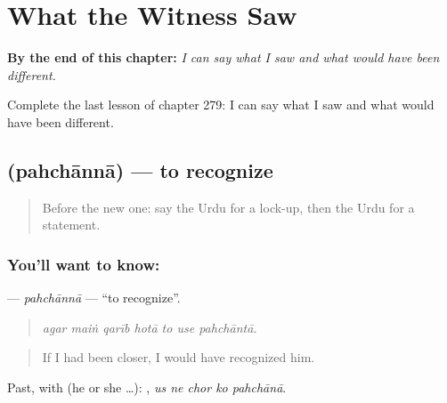 
\chapter{What the Witness Saw}
\label{ch:ur-what-the-witness-saw}

\begin{chapteropening}
\textbf{By the end of this chapter:} \emph{I can say what I saw and what would have been different.}

Complete the last lesson of chapter 279: I can say what I saw and what would have been different.
\end{chapteropening}

\section[\texorpdfstring{\ur{پہچاننا} (pahchānnā)}{پہچاننا (pahchānnā)}]{ (pahchānnā) — to recognize}

\label{lesson:UR-C279-pahchanna}



\begin{quote}
Before the new one: say the Urdu for a lock-up, then the Urdu for a statement.
\end{quote}

\subsection*{You'll want to know: }
\textbf{} — \emph{pahchānnā} — \textquotedblleft{}to recognize\textquotedblright{}.

\begin{quote}
      
\end{quote}

\begin{quote}
\emph{agar maiṅ qarīb hotā to use pahchāntā.}
\end{quote}

\begin{quote}
If I had been closer, I would have recognized him.
\end{quote}

Past, with  (he or she …):     , \emph{us ne chor ko pahchānā}.

